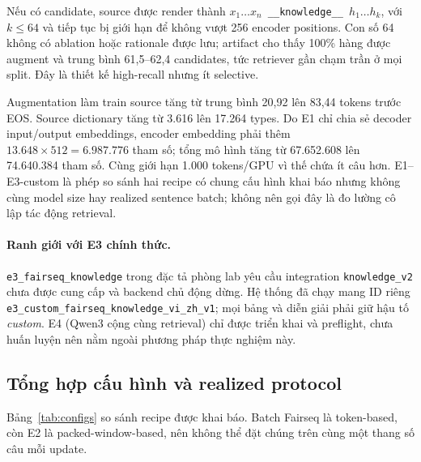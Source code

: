 Nếu có candidate, source được render thành
\texttt{$x_1\ldots x_n$ \_\_knowledge\_\_ $h_1\ldots h_k$}, với
$k\leq64$ và tiếp tục bị giới hạn để không vượt 256 encoder positions. Con số
64 không có ablation hoặc rationale được lưu; artifact cho thấy 100\% hàng
được augment và trung bình 61,5--62,4 candidates, tức retriever gần chạm trần
ở mọi split. Đây là thiết kế high-recall nhưng ít selective.

Augmentation làm train source tăng từ trung bình 20,92 lên 83,44 tokens trước
EOS. Source dictionary tăng từ 3.616 lên 17.264 types. Do E1 chỉ chia sẻ
decoder input/output embeddings, encoder embedding phải thêm
$13.648\times512=6.987.776$ tham số; tổng mô hình tăng từ 67.652.608 lên
74.640.384 tham số. Cùng giới hạn 1.000 tokens/GPU vì thế chứa ít câu hơn.
E1--E3-custom là phép so sánh hai recipe có chung cấu hình khai báo nhưng
không cùng model size hay realized sentence batch; không nên gọi đây là đo
lường cô lập tác động retrieval.

\paragraph{Ranh giới với E3 chính thức.}
\texttt{e3\_fairseq\_knowledge} trong đặc tả phòng lab yêu cầu integration
\texttt{knowledge\_v2} chưa được cung cấp và backend chủ động dừng. Hệ thống
đã chạy mang ID riêng
\texttt{e3\_custom\_fairseq\_knowledge\_vi\_zh\_v1}; mọi bảng và diễn giải
phải giữ hậu tố \emph{custom}. E4 (Qwen3 cộng cùng retrieval) chỉ được triển
khai và preflight, chưa huấn luyện nên nằm ngoài phương pháp thực nghiệm này.

\subsection{Tổng hợp cấu hình và realized protocol}

Bảng~\ref{tab:configs} so sánh recipe được khai báo. Batch Fairseq là
token-based, còn E2 là packed-window-based, nên không thể đặt chúng trên cùng
một thang số câu mỗi update.

